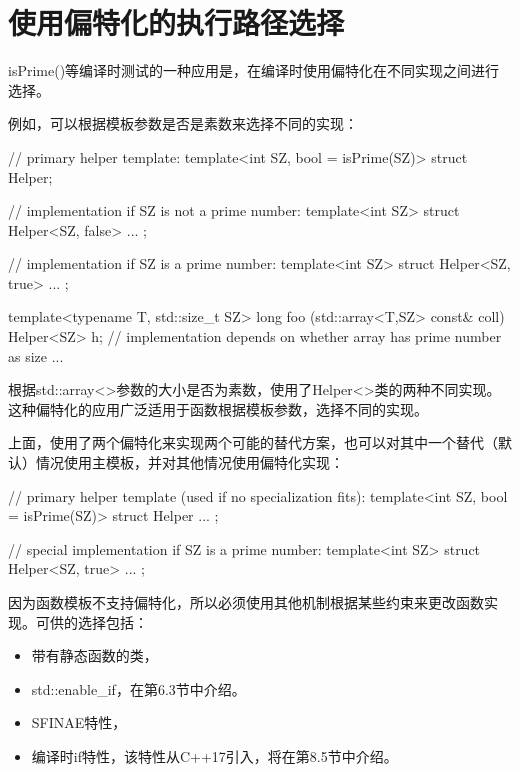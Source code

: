 \section{使用偏特化的执行路径选择}
isPrime()等编译时测试的一种应用是，在编译时使用偏特化在不同实现之间进行选择。

例如，可以根据模板参数是否是素数来选择不同的实现：

\begin{cpp}
// primary helper template:
template<int SZ, bool = isPrime(SZ)>
struct Helper;

// implementation if SZ is not a prime number:
template<int SZ>
struct Helper<SZ, false>
{
	...
};

// implementation if SZ is a prime number:
template<int SZ>
struct Helper<SZ, true>
{
	...
};

template<typename T, std::size_t SZ>
long foo (std::array<T,SZ> const& coll)
{
	Helper<SZ> h; // implementation depends on whether array has prime number as size
	...
}
\end{cpp}

根据std::array<>参数的大小是否为素数，使用了Helper<>类的两种不同实现。这种偏特化的应用广泛适用于函数根据模板参数，选择不同的实现。

上面，使用了两个偏特化来实现两个可能的替代方案，也可以对其中一个替代（默认）情况使用主模板，并对其他情况使用偏特化实现：

\begin{cpp}
// primary helper template (used if no specialization fits):
template<int SZ, bool = isPrime(SZ)>
struct Helper
{
	...
};

// special implementation if SZ is a prime number:
template<int SZ>
struct Helper<SZ, true>
{
	...
};
\end{cpp}

因为函数模板不支持偏特化，所以必须使用其他机制根据某些约束来更改函数实现。可供的选择包括：

\begin{itemize}
\item 
带有静态函数的类，

\item 
std::enable\_if，在第6.3节中介绍。

\item 
SFINAE特性，

\item 
编译时if特性，该特性从C++17引入，将在第8.5节中介绍。
\end{itemize}

